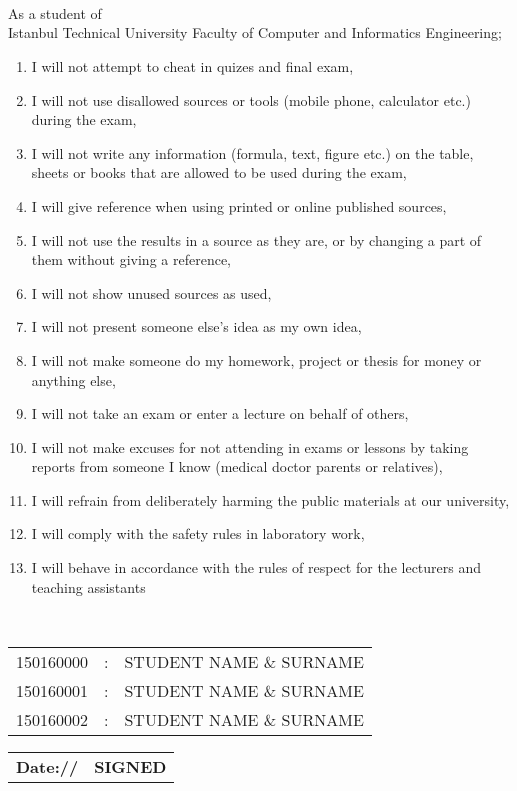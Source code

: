
\thispagestyle{empty}
\\
\\
\\[0.2cm]
As a student of \\Istanbul Technical University Faculty of Computer and Informatics Engineering;
\begin{enumerate}
    \item I will not attempt to cheat in quizes and final exam,
    \item I will not use disallowed sources or tools (mobile phone, calculator etc.) during the exam,
    \item I will not write any information (formula, text, figure etc.) on the table, sheets or books that are allowed to be used during the exam,
    \item I will give reference when using printed or online published sources,
    \item I will not use the results in a source as they are, or by changing a part of them without giving a reference,
    \item I will not show unused sources as used, 
    \item I will not present someone else’s idea as my own idea, 
    \item I will not make someone do my homework, project or thesis for money or anything else,
    \item I will not take an exam or enter a lecture on behalf of others,
    \item I will not make excuses for not attending in exams or lessons by taking reports from someone I know (medical doctor parents or relatives),
    \item I will refrain from deliberately harming the public materials at our university,  
    \item I will comply with the safety rules in laboratory work,
    \item I will behave in accordance with the rules of respect for the lecturers and teaching assistants
\end{enumerate}
\vspace{-1em}
\\
\vspace{-1em}
\begin{table}[ht]
\centering
\begin{tabular}{rcl}
150160000  & : & STUDENT NAME \& SURNAME \\
150160001  & : & STUDENT NAME \& SURNAME \\
150160002  & : & STUDENT NAME \& SURNAME \\
\end{tabular}
\end{table}
\vspace{-1em}
 \begin{table}[ht]
 \begin{tabular}{lr}
\textbf{Date:\hspace*{1.0cm}/\hspace*{1.0cm}/} &\qquad \qquad\qquad\qquad \qquad\qquad\qquad \qquad\qquad\qquad \qquad\qquad \textbf{SIGNED}\\
\end{tabular}
\end{table}